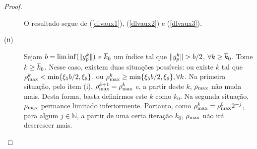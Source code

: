 \begin{proof}
\begin{description}
\begin{equation}
\end{equation} 
O resultado segue de (\ref{dlvaux1}), (\ref{dlvaux2}) e (\ref{dlvaux3}).
\item[(ii)] Sejam $b = \lim\inf(\Vert g_p^{k}\Vert)$ e $\overline{k}_0$ um índice tal
  que $\Vert g_p^{k}\Vert > b/2$, $\forall k \geq  \overline{k}_0$. Tome $k \geq
  \overline{k}_0$. Nesse caso, existem duas situações possíveis: ou existe $k$ tal
  que $\rho_{\max}^k < \min\{\xi_5b/2,\xi_6\}$, ou $\rho_{\max}^k \geq
  \min\{\xi_5b/2,\xi_6\}, \forall k$.
  Na primeira situação, pelo item (i), $\rho_{\max}^{k+1} = \rho_{\max}^{k}$ e, a partir
  deste $k$, $\rho_{\max}$ não muda mais. Desta forma, basta definirmos este $k$
  como $k_0$. Na segunda situação, $\rho_{\max}$ permance limitado inferiormente.
  Portanto, como $\rho_{\max}^k = \rho_{\max}^02^{-j}$, para algum $j\in\mathbb{N}$, a
  partir de uma certa iteração $k_0$, $\rho_{\max}$ não irá descrescer mais.


\end{description}
\end{proof}
